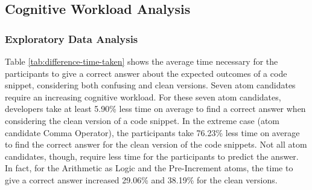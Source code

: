 
\subsection{Cognitive Workload Analysis}

\subsubsection*{Exploratory Data Analysis}
Table \ref{tab:difference-time-taken} shows the average time necessary for the participants to give a correct answer about the expected outcomes of a code snippet, considering both confusing and clean versions. Seven atom candidates require an increasing cognitive workload. For these seven atom candidates, developers take at least 5.90\% less time on average to find a correct answer when considering the clean version of a code snippet. In the extreme case (atom candidate Comma Operator), the participants take 76.23\% less
time on average to find the correct answer for the clean version of the code snippets. 
Not all atom candidates, though, require less time for the participants to predict the answer. In fact, for the Arithmetic as Logic and the Pre-Increment atoms, the time to give a correct answer increased  
29.06\% and 38.19\% for the clean versions.

